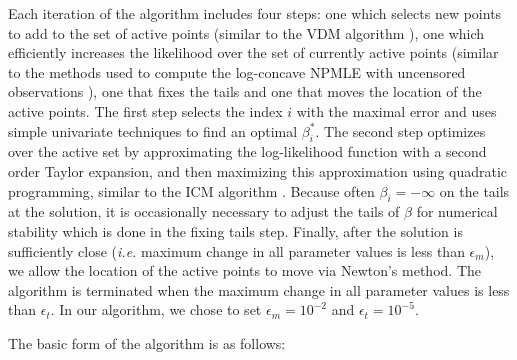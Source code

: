 	Each iteration of the algorithm includes four steps: one which selects new points to add to the set of active points (similar to the VDM algorithm \cite{RefF1972}), one which efficiently increases the likelihood over the set of currently active points (similar to the methods used to compute the log-concave NPMLE with uncensored observations \cite{RefDea2014}), one that fixes the tails and one that moves the location of the active points. The first step selects the index $i$ with the maximal error and uses simple univariate techniques to find an optimal $\beta_i^*$. The second step optimizes over the active set by approximating the log-likelihood function with a second order Taylor expansion, and then maximizing this approximation using quadratic programming, similar to the ICM algorithm \cite{RefJ1998}.  Because often $\beta_i = -\infty$ on the tails at the solution, it is occasionally necessary to adjust the tails of $\beta$ for numerical stability which is done in the fixing tails step. Finally, after the solution is sufficiently close (\emph{i.e.} maximum change in all parameter values is less than $\epsilon_m$), we allow the location of the active points to move via Newton's method. The algorithm is terminated when the maximum change in all parameter values is less than $\epsilon_t$. In our algorithm, we chose to set $\epsilon_m = 10^{-2}$ and $\epsilon_t = 10^{-5}$. 
	
	 The basic form of the algorithm is as follows:
	
	\vspace{3mm}
	
